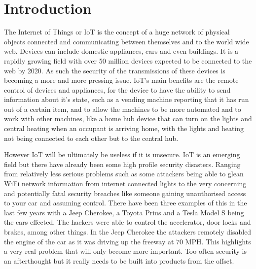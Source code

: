
\chapter{Introduction}
\label{intro}


\newcommand{\keyword}[1]{\textbf{#1}}
\newcommand{\tabhead}[1]{\textbf{#1}}
\newcommand{\code}[1]{\texttt{#1}}
\newcommand{\file}[1]{\texttt{\bfseries#1}}
\newcommand{\option}[1]{\texttt{\itshape#1}}


The Internet of Things or IoT is the concept of a huge network of physical objects connected and communicating between themselves and to the world wide web. Devices can include domestic appliances, cars and even buildings. It is a rapidly growing field with over 50 million devices expected to be connected to the web by 2020\cite{50milby2020}. As such the security of the transmissions of these devices is becoming a more and more pressing issue. IoT's main benefits are the remote control of devices and appliances, for the device to have the ability to send information about it's state, such as a vending machine reporting that it has run out of a certain item, and to allow the machines to be more automated and to work with other machines, like a home hub device that can turn on the lights and central heating when an occupant is arriving home, with the lights and heating not being connected to each other but to the central hub.
	
	However IoT will be ultimately be useless if it is unsecure. IoT is an emerging field but there have already been some high profile security disasters. Ranging from relatively less serious problems such as some attackers being able to glean WiFi network information from internet connected lights\cite{hackingsum} to the very concerning and potentially fatal security breaches like someone gaining unauthorised access to your car and assuming control. There have been three examples of this in the last few years with a Jeep Cherokee\cite{jeephack}, a Toyota Prius\cite{priushack} and a Tesla Model S\cite{teslahack} being the cars effected. The hackers were able to control the accelerator, door locks and brakes, among other things. In the Jeep Cherokee the attackers remotely disabled the engine of the car as it was driving up the freeway at 70 MPH. This highlights a very real problem that will only become more important. Too often security is an afterthought but it really needs to be built into products from the offset.

